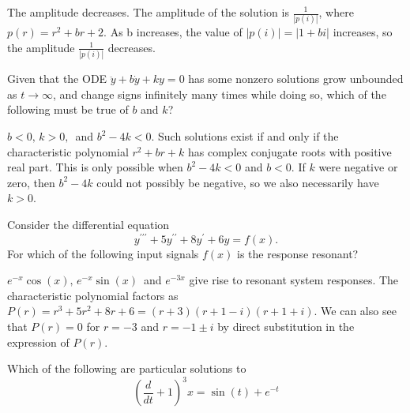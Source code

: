 The amplitude decreases.
The amplitude of the solution is $\frac{1}{|p(i)|}$, where $p(r)=r^2+br+2$.
As b increases, the value of $|p(i)|=|1+bi|$ increases,
so the amplitude $\frac{1}{|p(i)|}$ decreases.

\begin{problem}
  Given that the ODE $\ddot y+ b \dot y + ky=0$ has
  some nonzero solutions grow unbounded as $t \to \infty$,
  and change signs infinitely many times while doing so,
  which of the following must be true of $b$ and $k$?
\end{problem}
$b < 0,\, k>0,\,$  and $b^2−4k<0$. 
Such solutions exist if and only if the characteristic polynomial $r^2+br+k$ has complex conjugate roots with positive real part.
This is only possible when $b^2−4k<0$ and $b<0$. 
If $k$ were negative or zero, then $b^2−4k$ could not possibly be negative,
so we also necessarily have $k>0$.

\begin{problem}
  Consider the differential equation
  \begin{equation*}
    \displaystyle  y^{\prime \prime \prime } +5y^{\prime \prime } + 8y^{\prime } +6y = f(x).
  \end{equation*}
  For which of the following input signals $f(x)$ is the response resonant?
\end{problem}

$e^{-x}\cos (x),\, e^{-x}\sin (x)\, $ and $e^{-3x}$ give rise to resonant system responses.
The characteristic polynomial factors as $P(r)=r^3+5r^2+8r+6=(r+3)(r+1−i)(r+1+i)$.
We can also see that $P(r)=0$ for $r=−3$ and $r=−1 \pm i$
by direct substitution in the expression of $P(r)$.

\begin{problem}
  Which of the following are particular solutions to
  \begin{equation*}
    \displaystyle  \left(\frac{d}{dt} + 1\right)^3x = \sin (t) + e^{-t}
  \end{equation*}
 \end{problem}

